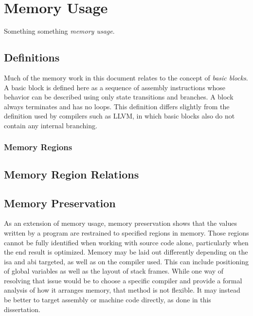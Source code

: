 \chapter{Memory Usage}\label{ch:memory}

Something something \emph{memory usage}.%

\section{Definitions}
Much of the memory work in this document relates to the concept of
\emph{basic blocks}.
A basic block is defined here as a sequence of assembly instructions
whose behavior can be described using only state transitions and branches.
A block always terminates and has no loops.
This definition differs slightly from the definition used by compilers such as LLVM,
in which basic blocks also do not contain any internal branching.

\subsection{Memory Regions}\label{memory_regions}
%

\section{Memory Region Relations}\label{mem_reg_rel}
%

\section{Memory Preservation}\label{se:memory_preservation}
As an extension of memory usage,
memory preservation shows that the values written by a program%
are restrained to specified regions in memory.
Those regions cannot be fully identified when working with source code alone,
particularly when the end result is optimized.
Memory may be laid out differently depending on the \ac{isa} and \ac{abi} targeted,
as well as on the compiler used.
This can include positioning of global variables
as well as the layout of stack frames.
While one way of resolving that issue would be to choose a specific compiler
and provide a formal analysis of how it arranges memory, that method is not flexible.
It may instead be better to target assembly or machine code directly,
as done in this dissertation.

